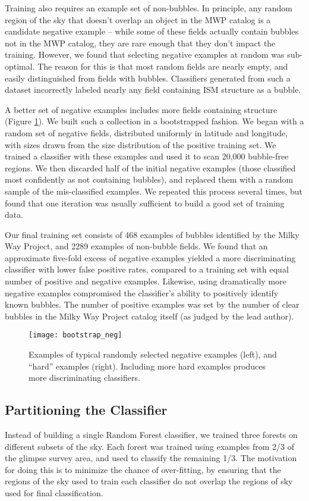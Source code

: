 \documentclass[preprint]{aastex}
\begin{document}
Training also requires an example set of non-bubbles. In principle, any random region of the sky that doesn't overlap an object in the MWP catalog is a candidate negative example -- while some of these fields actually contain bubbles not in the MWP catalog, they are rare enough that they don't  impact the training. However, we found that selecting negative examples at random was sub-optimal. The reason for this is that most random fields are nearly empty, and easily distinguished from fields with bubbles. Classifiers generated from such a dataset incorrectly labeled nearly any field containing ISM structure as a bubble.

A better set of negative examples includes more fields containing structure (Figure \ref{fig:bootstrap_neg}). We built such a collection in a bootstrapped fashion. We began with a random set of negative fields, distributed uniformly in latitude and longitude, with sizes drawn from the size distribution of the positive training set. We trained a classifier with these examples and used it to scan 20,000 bubble-free regions. We then discarded half of the initial negative examples (those classified most confidently as not containing bubbles), and replaced them with a random sample of the mis-classified examples. We repeated this process several times, but found that one iteration was usually sufficient to build a good set of training data.

Our final training set consists of 468 examples of bubbles identified by the Milky Way Project, and 2289 examples of non-bubble fields. We found that an approximate five-fold excess of negative examples yielded a more discriminating classifier with lower false positive rates, compared to a training set with equal number of positive and negative examples. Likewise, using dramatically more negative examples compromised the classifier's ability to positively identify known bubbles. The number of positive examples was set by the number of clear bubbles in the Milky Way Project catalog itself (as judged by the lead author).

\begin{figure}[h!]
\texttt{[image: bootstrap\_neg]}
\caption{Examples of typical randomly selected negative examples (left), and ``hard'' examples (right). Including more hard examples produces more discriminating classifiers.}
\label{fig:bootstrap_neg}
\end{figure}

\subsection{Partitioning the Classifier}
\label{sec:partition}
Instead of building a single Random Forest classifier, we trained three forests on different subsets of the sky. Each forest was trained using examples from 2/3 of the {\sc glimpse} survey area, and used to classify the remaining 1/3. The motivation for doing this is to minimize the chance of over-fitting, by ensuring that the regions of the sky used to train each classifier do not overlap the regions of sky used for final classification. 
\end{document}
